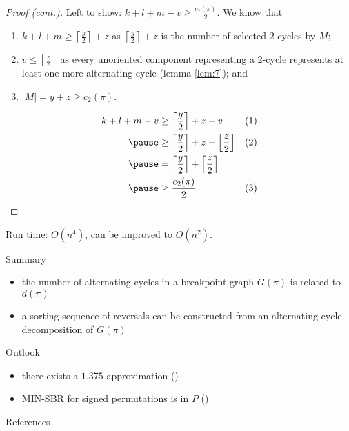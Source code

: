 \documentclass{beamer}
\theoremstyle{definition}
\def\spadding{\vspace{0.25cm}}
\begin{document}
\begin{frame}

\begin{proof}[Proof (cont.)]
Left to show: $k+l+m-v \geq \frac{c_2(\pi)}{2}$. \pause We know that
\begin{enumerate}
    \item $k+l+m \geq \left\lceil \frac{y}{2} \right\rceil + z$ as $\left\lceil \frac{y}{2} \right\rceil + z$ is the number of selected $2$-cycles by $M$\pause;
    \item $v \leq \left\lfloor \frac{z}{2} \right\rfloor$ as every unoriented component representing a $2$-cycle represents at least one more alternating cycle (lemma \ref{lem:7})\pause; and
    \item $|M| = y+z \geq c_2(\pi)$.
\end{enumerate}\pause
\begin{align*}
    k+l+m-v &\geq \left\lceil \frac{y}{2} \right\rceil + z - v                                          & (1) \\ \pause
            &\geq \left\lceil \frac{y}{2} \right\rceil + z - \left\lfloor \frac{z}{2} \right\rfloor     & (2) \\ \pause
            &= \left\lceil \frac{y}{2} \right\rceil + \left\lceil \frac{z}{2} \right\rceil \\ \pause
            &\geq \frac{c_2(\pi)}{2}                                                                    & (3)
\end{align*}
\end{proof}

\end{frame}

\begin{frame}

Run time: $O(n^4)$, can be improved to $O(n^2)$.\spadding

\begin{block}{Summary}
\begin{itemize}
    \item the number of alternating cycles in a breakpoint graph $G(\pi)$ is related to $d(\pi)$
    \item a sorting sequence of reversals can be constructed from an alternating cycle decomposition of $G(\pi)$
\end{itemize}
\end{block}

\begin{block}{Outlook}
\begin{itemize}
    \item there exists a $1.375$-approximation (\citeauthor*{Berman2001})
    \item MIN-SBR for signed permutations is in $P$ (\citeauthor*{Hannenhalli1995})
\end{itemize}
\end{block}

\end{frame}

\begin{frame}[allowframebreaks]{References}

\nocite{*}
\printbibliography

\end{frame}
\end{document}
